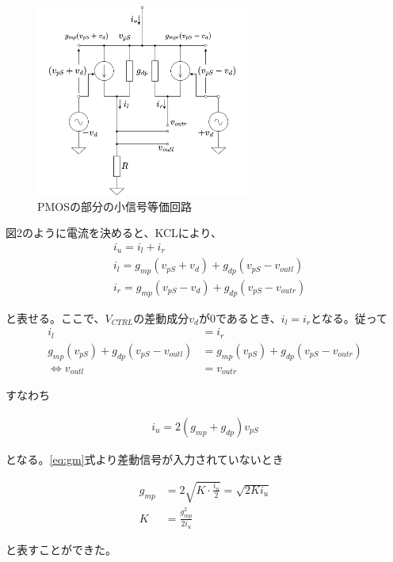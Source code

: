 \documentclass[twocolumn]{jsarticle}
\begin{document}
\begin{figure}[h]
    \includegraphics*[width=70mm]{figures/FoldedGilbertVctrlEquivalentCircuit.png}
    \caption{PMOSの部分の小信号等価回路}
\end{figure}

図2のように電流を決めると、KCLにより、
\begin{align}
    &i_{u}=i_{l}+i_{r}\\
    &i_{l}=g_{mp}(v_{pS}+v_{d})+g_{dp}(v_{pS}-v_{outl})\\
    &i_{r}=g_{mp}(v_{pS}-v_{d})+g_{dp}(v_{pS}-v_{outr})
\end{align}

と表せる。ここで、$V_{CTRL}$の差動成分$v_{d}$が$0$であるとき、$i_{l}=i_{r}$となる。従って
\begin{align*}
    i_{l}&=i_{r}\\
    g_{mp}(v_{pS})+g_{dp}(v_{pS}-v_{outl})&=g_{mp}(v_{pS})+g_{dp}(v_{pS}-v_{outr})\\
    \iff v_{outl}&=v_{outr}
\end{align*}

すなわち

\begin{align}
    i_{u}=2(g_{mp}+g_{dp})v_{pS}
\end{align}

となる。\eqref{eq:gm}式より差動信号が入力されていないとき

\begin{align}
    g_{mp}&=2\sqrt{K\cdot\frac{i_{u}}{2}}=\sqrt{2Ki_{u}}\\
    K&=\frac{g_{mp}^{2}}{2i_{u}}
\end{align}

と表すことができた。
\end{document}
